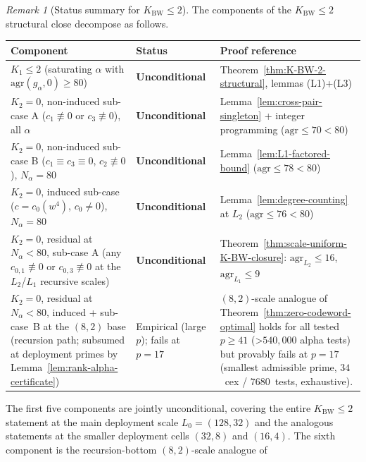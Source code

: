 \documentclass[11pt]{article}
\theoremstyle{definition}
\theoremstyle{remark}
\newtheorem{remark}[theorem]{Remark}
\begin{document}
\begin{remark}[Status summary for $K_{\mathrm{BW}} \leq 2$]
\label{rem:K-BW-status-summary}
The components of the $K_{\mathrm{BW}} \leq 2$ structural close decompose
as follows.
\begin{center}
\small
\begin{tabular}{p{}p{}p{}}
\toprule
Component & Status & Proof reference \\ \midrule
$K_1 \leq 2$ (saturating $\alpha$ with $\mathrm{agr}(g_\alpha, 0) \geq 80$) &
\textbf{Unconditional} &
Theorem~\ref{thm:K-BW-2-structural}, lemmas (L1)+(L3) \\
$K_2 = 0$, non-induced sub-case A ($c_1 \not\equiv 0$ or $c_3 \not\equiv 0$),
all $\alpha$ &
\textbf{Unconditional} &
Lemma~\ref{lem:cross-pair-singleton} + integer programming
($\mathrm{agr} \leq 70 < 80$) \\
$K_2 = 0$, non-induced sub-case B ($c_1 \equiv c_3 \equiv 0$,
$c_2 \not\equiv 0$), $N_\alpha = 80$ &
\textbf{Unconditional} &
Lemma~\ref{lem:L1-factored-bound} ($\mathrm{agr} \leq 78 < 80$) \\
$K_2 = 0$, induced sub-case ($c = c_0(w^4)$, $c_0 \neq 0$),
$N_\alpha = 80$ &
\textbf{Unconditional} &
Lemma~\ref{lem:degree-counting} at $L_2$ ($\mathrm{agr} \leq 76 < 80$) \\
$K_2 = 0$, residual at $N_\alpha < 80$, sub-case A
(any $c_{0,1} \not\equiv 0$ or $c_{0,3} \not\equiv 0$ at the $L_2$/$L_1$
recursive scales) &
\textbf{Unconditional} &
Theorem~\ref{thm:scale-uniform-K-BW-closure}: $\mathrm{agr}_{L_2} \leq 16$,
$\mathrm{agr}_{L_1} \leq 9$ \\
$K_2 = 0$, residual at $N_\alpha < 80$, induced + sub-case~B at the
$(8, 2)$ base (recursion path; subsumed at deployment primes by
Lemma~\ref{lem:rank-alpha-certificate}) &
Empirical (large $p$); fails at $p = 17$ &
$(8, 2)$-scale analogue of Theorem~\ref{thm:zero-codeword-optimal}
holds for all tested $p \geq 41$ (\textgreater $540{,}000$ alpha
tests) but provably fails at $p = 17$ (smallest admissible prime,
$34$~cex / $7680$~tests, exhaustive). \\
\bottomrule
\end{tabular}
\end{center}
The first five components are jointly unconditional, covering the entire
$K_{\mathrm{BW}} \leq 2$ statement at the main deployment scale
$L_0 = (128, 32)$ and the analogous statements at the smaller
deployment cells $(32, 8)$ and $(16, 4)$. The sixth component is the
recursion-bottom $(8, 2)$-scale analogue of

\end{remark}
\end{document}
